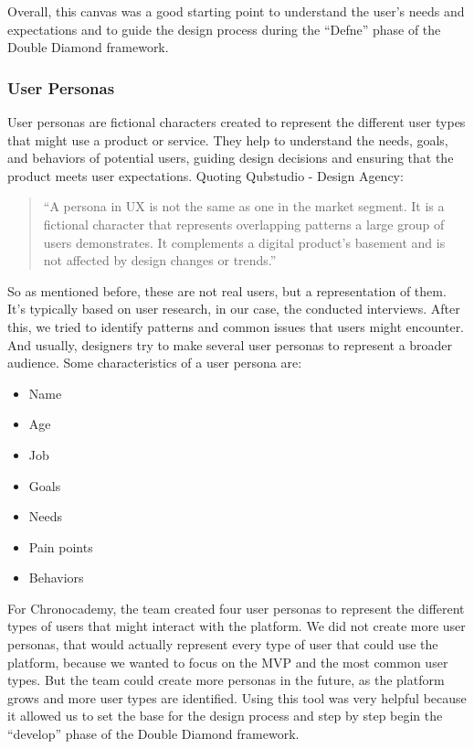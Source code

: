 Overall, this canvas was a good starting point to understand the user's needs and expectations and to guide the design process during the ``Defne'' phase of the Double Diamond framework.
\clearpage

\subsubsection{User Personas}\label{subsubsec:user-personas}
User personas are fictional characters created to represent the different user types that might use a product or service.
They help to understand the needs, goals, and behaviors of potential users, guiding design decisions and ensuring that the product meets user expectations.
Quoting Qubstudio - Design Agency:
\begin{quote}
    ``A persona in UX is not the same as one in the market segment.
    It is a
    fictional character that represents overlapping patterns a large group
    of users demonstrates.
    It complements a digital product’s basement and
    is not affected by design changes or trends.''~\cite[User Personas]{userPersonas}
\end{quote}
So as mentioned before, these are not real users, but a representation of them.
It's typically based on user research, in our case, the conducted interviews.
After this, we tried to identify patterns and common issues that users might encounter.
And usually, designers try to make several user personas to represent a broader audience.\newline\newline
Some characteristics of a user persona are:
\begin{itemize}
    \item Name
    \item Age
    \item Job
    \item Goals
    \item Needs
    \item Pain points
    \item Behaviors
\end{itemize}

For Chronocademy, the team created four user personas to represent the different types of users that might interact with the platform.
We did not create more user personas, that would actually represent every type of user that could use the platform, because we wanted to focus on the MVP and the most common user types.
But the team could create more personas in the future, as the platform grows and more user types are identified.
Using this tool was very helpful because it allowed us to set the base for the design process and step by step begin the ``develop'' phase of the Double Diamond framework.

